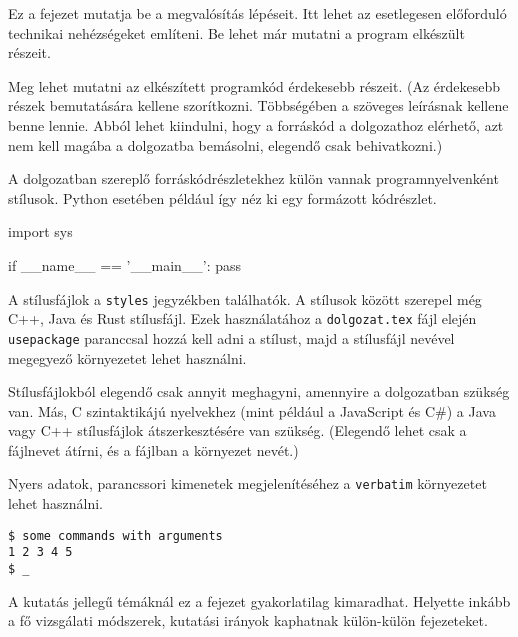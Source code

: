 
Ez a fejezet mutatja be a megvalósítás lépéseit.
Itt lehet az esetlegesen előforduló technikai nehézségeket említeni.
Be lehet már mutatni a program elkészült részeit.

Meg lehet mutatni az elkészített programkód érdekesebb részeit.
(Az érdekesebb részek bemutatására kellene szorítkozni.
Többségében a szöveges leírásnak kellene benne lennie.
Abból lehet kiindulni, hogy a forráskód a dolgozathoz elérhető, azt nem kell magába a dolgozatba bemásolni, elegendő csak behivatkozni.)

A dolgozatban szereplő forráskódrészletekhez külön vannak programnyelvenként stílusok.
Python esetében például így néz ki egy formázott kódrészlet.
\begin{python}
import sys

if __name__ == '__main__':
    pass
\end{python}

A stílusfájlok a \texttt{styles} jegyzékben találhatók.
A stílusok között szerepel még C++, Java és Rust stílusfájl.
Ezek használatához a \texttt{dolgozat.tex} fájl elején \texttt{usepackage} paranccsal hozzá kell adni a stílust, majd a stílusfájl nevével megegyező környezetet lehet használni.

Stílusfájlokból elegendő csak annyit meghagyni, amennyire a dolgozatban szükség van.
Más, C szintaktikájú nyelvekhez (mint például a JavaScript és C\#) a Java vagy C++ stílusfájlok átszerkesztésére van szükség.
(Elegendő lehet csak a fájlnevet átírni, és a fájlban a környezet nevét.)

Nyers adatok, parancssori kimenetek megjelenítéséhez a \texttt{verbatim} környezetet lehet használni.
\begin{verbatim}
$ some commands with arguments
1 2 3 4 5
$ _
\end{verbatim}

A kutatás jellegű témáknál ez a fejezet gyakorlatilag kimaradhat.
Helyette inkább a fő vizsgálati módszerek, kutatási irányok kaphatnak külön-külön fejezeteket.
